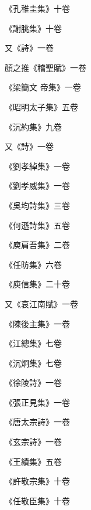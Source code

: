 \begin{pinyinscope}
 《孔稚圭集》十卷



 《謝朓集》十卷



 又《詩》一卷



 顏之推《稽聖賦》一卷



 《梁簡文
 帝集》一卷



 《昭明太子集》五卷



 《沉約集》九卷



 又《詩》一卷



 《劉孝綽集》一卷



 《劉孝威集》一卷



 《吳均詩集》三卷



 《何遜詩集》五卷



 《庾肩吾集》二卷



 《任昉集》六卷



 《庾信集》二十卷



 又《哀江南賦》一卷



 《陳後主集》一卷



 《江總集》七卷



 《沉炯集》七卷



 《徐陵詩》一卷



 《張正見集》一卷



 《唐太宗詩》一卷



 《玄宗詩》一卷



 《王績集》五卷



 《許敬宗集》十卷



 《任敬臣集》十卷




\end{pinyinscope}
